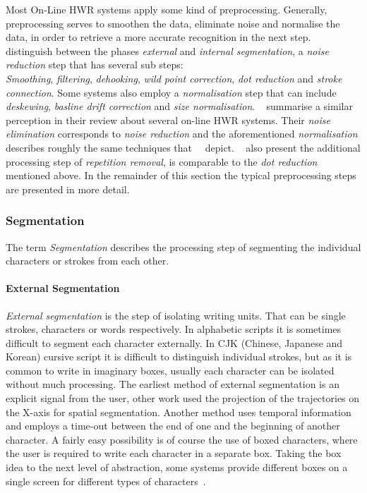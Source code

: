 Most On-Line HWR systems apply some kind of preprocessing. Generally, 
preprocessing serves to smoothen the data, eliminate noise and normalise the
data, in order to retrieve a more accurate recognition in the next step.
~\citeyear{Tappert1990} distinguish between the phases \emph{external} and 
\emph{internal segmentation}, a \emph{noise reduction} step that has several 
sub steps:\\
\emph{Smoothing}, \emph{filtering}, \emph{dehooking},
\emph{wild point correction}, \emph{dot reduction} and \emph{stroke connection}.
Some systems also employ a \emph{normalisation} step that can include
\emph{deskewing}, \emph{basline drift correction} and \emph{size normalisation}.
~\citeyear{Santosh2009} summarise a similar perception in their review about several
on-line HWR systems. Their \emph{noise elimination} corresponds to 
\emph{noise reduction} and the aforementioned \emph{normalisation} describes 
roughly the same techniques that~~\citeyear{Tappert1990} depict.
~\citeyear{Santosh2009} also present the additional processing step of 
\emph{repetition removal}, is comparable to the \emph{dot reduction} mentioned 
above. In the remainder of this section the typical preprocessing steps are 
presented in more detail.

\subsubsection{Segmentation}
\label{sec:segmentation}

The term \emph{Segmentation} describes the processing step of segmenting the 
individual characters or strokes from each other.

\paragraph{External Segmentation}
\label{sec:externasegmentation}
\emph{External segmentation} is the step of isolating writing units. That can be
single strokes, characters or words respectively. In alphabetic scripts it is 
sometimes difficult to segment each character externally. In CJK (Chinese, 
Japanese and Korean) cursive script it is difficult to distinguish individual 
strokes, but as it is common to write in imaginary boxes, usually each character 
can be isolated without much processing.
The earliest method of external segmentation is an explicit signal from the user,
other work used the projection of the trajectories on the X-axis for spatial
segmentation. Another method uses temporal information and employs a time-out
between the end of one and the beginning of another character.
A fairly easy possibility is of course the use of boxed characters, where the 
user is required to write each character in a separate box.
Taking the box idea to the next level of abstraction, some systems provide 
different boxes on a single screen for different types of 
characters~.

